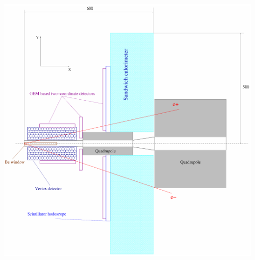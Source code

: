 \documentclass[10pt, pdf, hyperref={unicode}]{beamer}
\begin{document}
\begin{frame}
	\centering
	\includegraphics[height = \textheight]{eedet.png}
	\par
\end{frame}
\end{document}
